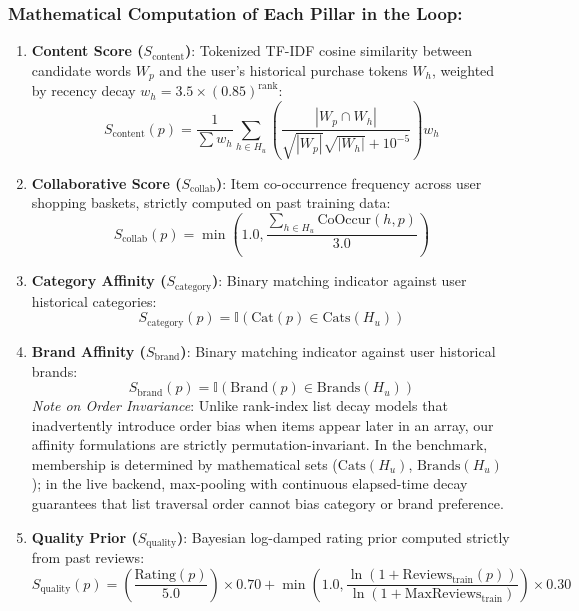\documentclass[11pt,a4paper]{article}
\begin{document}
\subsubsection{Mathematical Computation of Each Pillar in the Loop:}
\begin{enumerate}
    \item \textbf{Content Score ($S_{\text{content}}$)}: Tokenized TF-IDF cosine similarity between candidate words $W_p$ and the user's historical purchase tokens $W_h$, weighted by recency decay $w_h = 3.5 \times (0.85)^{\text{rank}}$:
    \begin{equation}
        S_{\text{content}}(p) = \frac{1}{\sum w_h} \sum_{h \in H_u} \left( \frac{|W_p \cap W_h|}{\sqrt{|W_p|} \sqrt{|W_h|} + 10^{-5}} \right) w_h
    \end{equation}
    \item \textbf{Collaborative Score ($S_{\text{collab}}$)}: Item co-occurrence frequency across user shopping baskets, strictly computed on past training data:
    \begin{equation}
        S_{\text{collab}}(p) = \min\left(1.0, \frac{\sum_{h \in H_u} \text{CoOccur}(h, p)}{3.0}\right)
    \end{equation}
    \item \textbf{Category Affinity ($S_{\text{category}}$)}: Binary matching indicator against user historical categories:
    \begin{equation}
        S_{\text{category}}(p) = \mathbb{I}(\text{Cat}(p) \in \text{Cats}(H_u))
    \end{equation}
    \item \textbf{Brand Affinity ($S_{\text{brand}}$)}: Binary matching indicator against user historical brands:
    \begin{equation}
        S_{\text{brand}}(p) = \mathbb{I}(\text{Brand}(p) \in \text{Brands}(H_u))
    \end{equation}
    \textit{Note on Order Invariance}: Unlike rank-index list decay models that inadvertently introduce order bias when items appear later in an array, our affinity formulations are strictly permutation-invariant. In the benchmark, membership is determined by mathematical sets ($\text{Cats}(H_u)$, $\text{Brands}(H_u)$); in the live backend, max-pooling with continuous elapsed-time decay guarantees that list traversal order cannot bias category or brand preference.
    \item \textbf{Quality Prior ($S_{\text{quality}}$)}: Bayesian log-damped rating prior computed strictly from past reviews:
    \begin{equation}
        S_{\text{quality}}(p) = \left(\frac{\text{Rating}(p)}{5.0}\right) \times 0.70 + \min\left(1.0, \frac{\ln(1 + \text{Reviews}_{\text{train}}(p))}{\ln(1 + \text{MaxReviews}_{\text{train}})}\right) \times 0.30
    \end{equation}
\end{enumerate}
\end{document}
